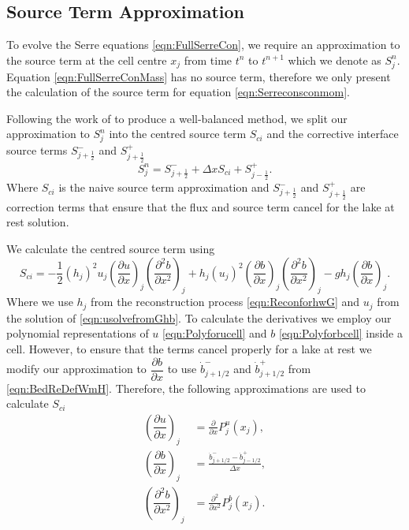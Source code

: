 \documentclass[times]{elsarticle}
\begin{document}
\subsection{Source Term Approximation}

To evolve the Serre equations \eqref{eqn:FullSerreCon}, we require an approximation to the source term at the cell centre $x_j$ from time $t^n$ to $t^{n+1}$ which we denote as $S^n_j$. Equation \eqref{eqn:FullSerreConMass} has no source term, therefore we only present the calculation of the source term for equation \eqref{eqn:Serreconsconmom}.

Following the work of \citet{Klein-etal-2004-2050} to produce a well-balanced method, we split our approximation to $S^n_j$ into the centred source term $S_{ci}$ and the corrective interface source terms $S^{-}_{j + \frac{1}{2}}$ and $S^{+}_{j + \frac{1}{2}}$
\begin{equation*}
S^n_j =  S^{-}_{j + \frac{1}{2}} + \Delta x S_{ci} + S^{+}_{j - \frac{1}{2}}.
\end{equation*}
Where $S_{ci}$ is the naive source term approximation and $S^{-}_{j + \frac{1}{2}}$ and $S^{+}_{j + \frac{1}{2}}$ are correction terms that ensure that the flux and source term cancel for the lake at rest solution. 

We calculate the centred source term using
\begin{equation*}
S_{ci} = -\frac{1}{2}\left(h_j\right)^2 {u_j}\left( \frac{\partial {u}}{\partial x} \right)_j \left(\frac{\partial^2 b}{\partial x^2} \right)_j  + h_j \left(u_j\right)^2 \left(\frac{\partial b}{\partial x}\right)_j \left(\frac{\partial^2 b}{\partial x^2}\right)_j - gh_j\left(\frac{\partial b}{\partial x}\right)_j.
\end{equation*}
Where we use $h_j$ from the reconstruction process \eqref{eqn:ReconforhwG} and $u_j$ from the solution of \eqref{eqn:usolvefromGhb}. To calculate the derivatives we employ our polynomial representations of $u$ \eqref{eqn:Polyforucell} and $b$ \eqref{eqn:Polyforbcell} inside a cell. However, to ensure that the terms cancel properly for a lake at rest we modify our approximation to $\dfrac{\partial b}{\partial x}$ to use $\dot{b}^-_{j+1/2}$ and $\dot{b}^+_{j+1/2}$ from \eqref{eqn:BedReDefWmH}. Therefore, the following approximations are used to calculate $S_{ci}$
\begin{align*}
\left(\dfrac{\partial {u}}{\partial x} \right)_{j} &= \frac{\partial }{\partial x}P^u_j(x_{j}),  \\
\left(\dfrac{\partial {b}}{\partial x} \right)_{j} &=  \frac{\dot{b}^-_{j+1/2} - \dot{b}^+_{j-1/2}}{\Delta x} , \\	
\left(\dfrac{\partial^2 {b}}{\partial x^2} \right)_{j} &= \frac{\partial^2 }{\partial x^2}P^b_j(x_{j}).
\end{align*}
\end{document}
